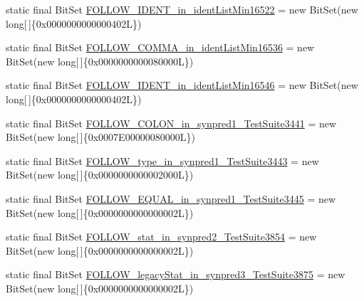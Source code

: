 \begin{DoxyCompactItemize}
\item 
static final Bit\-Set \hyperlink{classorg_1_1tzi_1_1use_1_1parser_1_1testsuite_1_1_test_suite_parser_a68d8a666e700931f896c85f90bd32a28}{F\-O\-L\-L\-O\-W\-\_\-\-I\-D\-E\-N\-T\-\_\-in\-\_\-ident\-List\-Min16522} = new Bit\-Set(new long\mbox{[}$\,$\mbox{]}\{0x0000000000000402\-L\})
\item 
static final Bit\-Set \hyperlink{classorg_1_1tzi_1_1use_1_1parser_1_1testsuite_1_1_test_suite_parser_abfd85abcd27eaeb988d492eafca59df0}{F\-O\-L\-L\-O\-W\-\_\-\-C\-O\-M\-M\-A\-\_\-in\-\_\-ident\-List\-Min16536} = new Bit\-Set(new long\mbox{[}$\,$\mbox{]}\{0x0000000000080000\-L\})
\item 
static final Bit\-Set \hyperlink{classorg_1_1tzi_1_1use_1_1parser_1_1testsuite_1_1_test_suite_parser_aea27a130369664af96b78a6c4fa25786}{F\-O\-L\-L\-O\-W\-\_\-\-I\-D\-E\-N\-T\-\_\-in\-\_\-ident\-List\-Min16546} = new Bit\-Set(new long\mbox{[}$\,$\mbox{]}\{0x0000000000000402\-L\})
\item 
static final Bit\-Set \hyperlink{classorg_1_1tzi_1_1use_1_1parser_1_1testsuite_1_1_test_suite_parser_a633772bbba135cc83db13fa3292719b2}{F\-O\-L\-L\-O\-W\-\_\-\-C\-O\-L\-O\-N\-\_\-in\-\_\-synpred1\-\_\-\-Test\-Suite3441} = new Bit\-Set(new long\mbox{[}$\,$\mbox{]}\{0x0007\-E00000080000\-L\})
\item 
static final Bit\-Set \hyperlink{classorg_1_1tzi_1_1use_1_1parser_1_1testsuite_1_1_test_suite_parser_aa7ddebe0c2bf27010af664140d236253}{F\-O\-L\-L\-O\-W\-\_\-type\-\_\-in\-\_\-synpred1\-\_\-\-Test\-Suite3443} = new Bit\-Set(new long\mbox{[}$\,$\mbox{]}\{0x0000000000002000\-L\})
\item 
static final Bit\-Set \hyperlink{classorg_1_1tzi_1_1use_1_1parser_1_1testsuite_1_1_test_suite_parser_a53532901408b9f97f49a17f8a53c9e81}{F\-O\-L\-L\-O\-W\-\_\-\-E\-Q\-U\-A\-L\-\_\-in\-\_\-synpred1\-\_\-\-Test\-Suite3445} = new Bit\-Set(new long\mbox{[}$\,$\mbox{]}\{0x0000000000000002\-L\})
\item 
static final Bit\-Set \hyperlink{classorg_1_1tzi_1_1use_1_1parser_1_1testsuite_1_1_test_suite_parser_ae760e835eb741b10bda574a53379f69a}{F\-O\-L\-L\-O\-W\-\_\-stat\-\_\-in\-\_\-synpred2\-\_\-\-Test\-Suite3854} = new Bit\-Set(new long\mbox{[}$\,$\mbox{]}\{0x0000000000000002\-L\})
\item 
static final Bit\-Set \hyperlink{classorg_1_1tzi_1_1use_1_1parser_1_1testsuite_1_1_test_suite_parser_a7994104ca5ff3bc43f668f8a5e6d365d}{F\-O\-L\-L\-O\-W\-\_\-legacy\-Stat\-\_\-in\-\_\-synpred3\-\_\-\-Test\-Suite3875} = new Bit\-Set(new long\mbox{[}$\,$\mbox{]}\{0x0000000000000002\-L\})

\end{DoxyCompactItemize}
